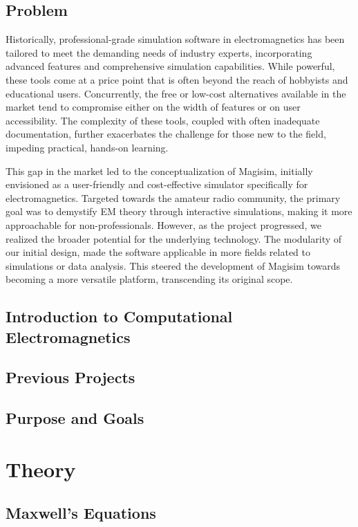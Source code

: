 \documentclass[11pt, a4paper, titlepage]{article}
\begin{document}
\subsection{Problem}
Historically, professional-grade simulation software in electromagnetics has been tailored to meet the demanding needs of industry experts, incorporating advanced features and comprehensive simulation capabilities. While powerful, these tools come at a price point that is often beyond the reach of hobbyists and educational users. Concurrently, the free or low-cost alternatives available in the market tend to compromise either on the width of features or on user accessibility. The complexity of these tools, coupled with often inadequate documentation, further exacerbates the challenge for those new to the field, impeding practical, hands-on learning.

This gap in the market led to the conceptualization of Magisim, initially envisioned as a user-friendly and cost-effective simulator specifically for electromagnetics. Targeted towards the amateur radio community, the primary goal was to demystify EM theory through interactive simulations, making it more approachable for non-professionals. However, as the project progressed, we realized the broader potential for the underlying technology. The modularity of our initial design, made the software applicable in more fields related to simulations or data analysis. This steered the development of Magisim towards becoming a more versatile platform, transcending its original scope.

\subsection{Introduction to Computational Electromagnetics}
\subsection{Previous Projects}
\subsection{Purpose and Goals}
\newpage




\section{Theory}
\subsection{Maxwell's Equations}
\end{document}
